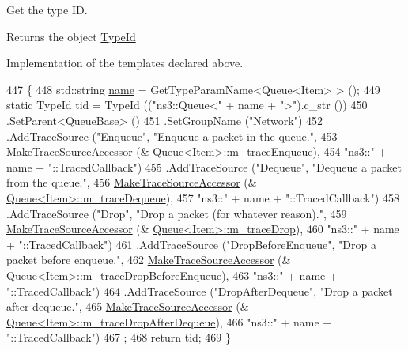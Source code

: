 Get the type ID. 

\begin{DoxyReturn}{Returns}
the object \hyperlink{classns3_1_1TypeId}{Type\+Id}
\end{DoxyReturn}
Implementation of the templates declared above. 
\begin{DoxyCode}
447 \{
448   std::string \hyperlink{generate__test__data__lte__spectrum__model_8m_ab74e6bf80237ddc4109968cedc58c151}{name} = GetTypeParamName<Queue<Item> > ();
449   \textcolor{keyword}{static} TypeId tid = TypeId ((\textcolor{stringliteral}{"ns3::Queue<"} + name + \textcolor{stringliteral}{">"}).c\_str ())
450     .SetParent<\hyperlink{classns3_1_1QueueBase_abcd8c49940cac764ecbbaa46e0e242dd}{QueueBase}> ()
451     .SetGroupName (\textcolor{stringliteral}{"Network"})
452     .AddTraceSource (\textcolor{stringliteral}{"Enqueue"}, \textcolor{stringliteral}{"Enqueue a packet in the queue."},
453                      \hyperlink{group__tracing_gab21a770b9855af4e8f69f7531ea4a6b0}{MakeTraceSourceAccessor} (&
      \hyperlink{classns3_1_1Queue_a5b68f278485844894ca6395c25d8fefd}{Queue<Item>::m\_traceEnqueue}),
454                      \textcolor{stringliteral}{"ns3::"} + name + \textcolor{stringliteral}{"::TracedCallback"})
455     .AddTraceSource (\textcolor{stringliteral}{"Dequeue"}, \textcolor{stringliteral}{"Dequeue a packet from the queue."},
456                      \hyperlink{group__tracing_gab21a770b9855af4e8f69f7531ea4a6b0}{MakeTraceSourceAccessor} (&
      \hyperlink{classns3_1_1Queue_acba7318200df563f801b26677163df6e}{Queue<Item>::m\_traceDequeue}),
457                      \textcolor{stringliteral}{"ns3::"} + name + \textcolor{stringliteral}{"::TracedCallback"})
458     .AddTraceSource (\textcolor{stringliteral}{"Drop"}, \textcolor{stringliteral}{"Drop a packet (for whatever reason)."},
459                      \hyperlink{group__tracing_gab21a770b9855af4e8f69f7531ea4a6b0}{MakeTraceSourceAccessor} (&
      \hyperlink{classns3_1_1Queue_adf7eee762113de3df7f4b6a7128b036c}{Queue<Item>::m\_traceDrop}),
460                      \textcolor{stringliteral}{"ns3::"} + name + \textcolor{stringliteral}{"::TracedCallback"})
461     .AddTraceSource (\textcolor{stringliteral}{"DropBeforeEnqueue"}, \textcolor{stringliteral}{"Drop a packet before enqueue."},
462                      \hyperlink{group__tracing_gab21a770b9855af4e8f69f7531ea4a6b0}{MakeTraceSourceAccessor} (&
      \hyperlink{classns3_1_1Queue_a97022bc9ac1f1729b9069c6a9abdabdb}{Queue<Item>::m\_traceDropBeforeEnqueue}),
463                      \textcolor{stringliteral}{"ns3::"} + name + \textcolor{stringliteral}{"::TracedCallback"})
464     .AddTraceSource (\textcolor{stringliteral}{"DropAfterDequeue"}, \textcolor{stringliteral}{"Drop a packet after dequeue."},
465                      \hyperlink{group__tracing_gab21a770b9855af4e8f69f7531ea4a6b0}{MakeTraceSourceAccessor} (&
      \hyperlink{classns3_1_1Queue_a9182ff9fab4c097f437eba67dc442762}{Queue<Item>::m\_traceDropAfterDequeue}),
466                      \textcolor{stringliteral}{"ns3::"} + name + \textcolor{stringliteral}{"::TracedCallback"})
467   ;
468   \textcolor{keywordflow}{return} tid;
469 \}
\end{DoxyCode}


